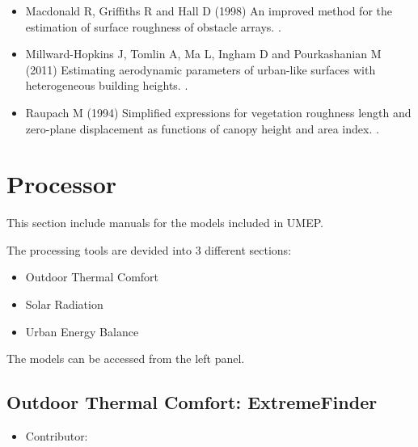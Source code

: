 \documentclass[letterpaper,10pt,english]{sphinxmanual}
\begin{document}
\begin{itemize}
\begin{description}
\begin{itemize}
\begin{description}
\begin{itemize}
\item {} 
Macdonald R, Griffiths R and Hall D (1998) An improved method for the
estimation of surface roughness of obstacle arrays. .

\item {} 
Millward-Hopkins J, Tomlin A, Ma L, Ingham D and Pourkashanian M
(2011) Estimating aerodynamic parameters of urban-like surfaces with
heterogeneous building heights. .

\item {} 
Raupach M (1994) Simplified expressions for vegetation roughness
length and zero-plane displacement as functions of canopy height and
area index. .

\end{itemize}

\end{description}

\end{itemize}

\end{description}

\end{itemize}


\chapter{Processor}
\label{\detokenize{processor/Processor:processor}}\label{\detokenize{processor/Processor::doc}}
This section include manuals for the models included in UMEP.

The processing tools are devided into 3 different sections:
\begin{itemize}
\item {} 
Outdoor Thermal Comfort

\item {} 
Solar Radiation

\item {} 
Urban Energy Balance

\end{itemize}

The models can be accessed from the left panel.


\section{Outdoor Thermal Comfort: ExtremeFinder}
\label{\detokenize{processor/Outdoor Thermal Comfort ExtremeFinder:outdoor-thermal-comfort-extremefinder}}\label{\detokenize{processor/Outdoor Thermal Comfort ExtremeFinder:extremefinder}}\label{\detokenize{processor/Outdoor Thermal Comfort ExtremeFinder::doc}}\begin{itemize}
\item {} 
Contributor:

\end{itemize}
\end{document}

